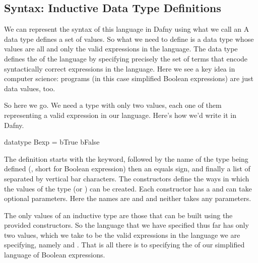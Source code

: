 \documentclass[letterpaper,10pt,english]{sphinxmanual}
\begin{document}
\subsection{Syntax: Inductive Data Type Definitions}
\label{\detokenize{10-formal-languages:syntax-inductive-data-type-definitions}}
We can represent the syntax of this language in Dafny using what we
call an  A data type defines a set of
values. So what we need to define is a data type whose values are all
and only the valid expressions in the language. The data type defines
the  of the language by specifying precisely the set of terms
that encode syntactically correct expressions in the language. Here we
see a key idea in computer science: programs (in this case simplified
Boolean expressions) are just data values, too.

So here we go. We need a type with only two values, each one of them
representing a valid expression in our language. Here’s how we’d write
it in Dafny.

\begin{sphinxVerbatim}[commandchars=\\\{\}]
datatype Bexp =
     bTrue \textbar{}
     bFalse
\end{sphinxVerbatim}

The definition starts with the  keyword, followed by the
name of the type being defined (, short for Boolean expression)
then an equals sign, and finally a list of  separated by
vertical bar characters. The constructors define the ways in which the
values of the type (or ) can be created. Each constructor has a
and can take optional parameters. Here the names are  and
 and neither takes any parameters.

The only values of an inductive type are those that can be built using
the provided constructors. So the language that we have specified thus
far has only two values, which we take to be the valid expressions in
the language we are specifying, namely  and .  That is
all there is to specifying the  of our simplified language of
Boolean expressions.
\end{document}

